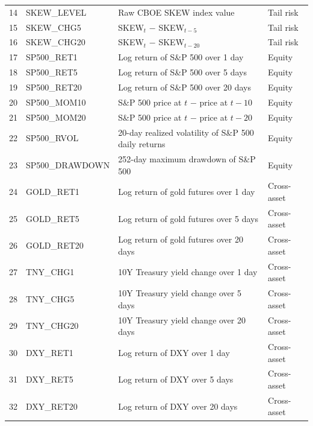 \documentclass[11pt]{article}
\begin{document}
\begin{table}[H]
\begin{tabular}{llll}
\midrule
14 & SKEW\_LEVEL       & Raw CBOE SKEW index value                                  & Tail risk \\
15 & SKEW\_CHG5        & SKEW$_t$ $-$ SKEW$_{t-5}$                                  & Tail risk \\
16 & SKEW\_CHG20       & SKEW$_t$ $-$ SKEW$_{t-20}$                                 & Tail risk \\
\midrule
17 & SP500\_RET1       & Log return of S\&P 500 over 1 day                          & Equity \\
18 & SP500\_RET5       & Log return of S\&P 500 over 5 days                         & Equity \\
19 & SP500\_RET20      & Log return of S\&P 500 over 20 days                        & Equity \\
20 & SP500\_MOM10      & S\&P 500 price at $t$ $-$ price at $t-10$                  & Equity \\
21 & SP500\_MOM20      & S\&P 500 price at $t$ $-$ price at $t-20$                  & Equity \\
22 & SP500\_RVOL       & 20-day realized volatility of S\&P 500 daily returns        & Equity \\
23 & SP500\_DRAWDOWN   & 252-day maximum drawdown of S\&P 500                       & Equity \\
\midrule
24 & GOLD\_RET1        & Log return of gold futures over 1 day                      & Cross-asset \\
25 & GOLD\_RET5        & Log return of gold futures over 5 days                     & Cross-asset \\
26 & GOLD\_RET20       & Log return of gold futures over 20 days                    & Cross-asset \\
27 & TNY\_CHG1         & 10Y Treasury yield change over 1 day                       & Cross-asset \\
28 & TNY\_CHG5         & 10Y Treasury yield change over 5 days                      & Cross-asset \\
29 & TNY\_CHG20        & 10Y Treasury yield change over 20 days                     & Cross-asset \\
30 & DXY\_RET1         & Log return of DXY over 1 day                               & Cross-asset \\
31 & DXY\_RET5         & Log return of DXY over 5 days                              & Cross-asset \\
32 & DXY\_RET20        & Log return of DXY over 20 days                             & Cross-asset \\

\end{tabular}
\end{table}
\end{document}
